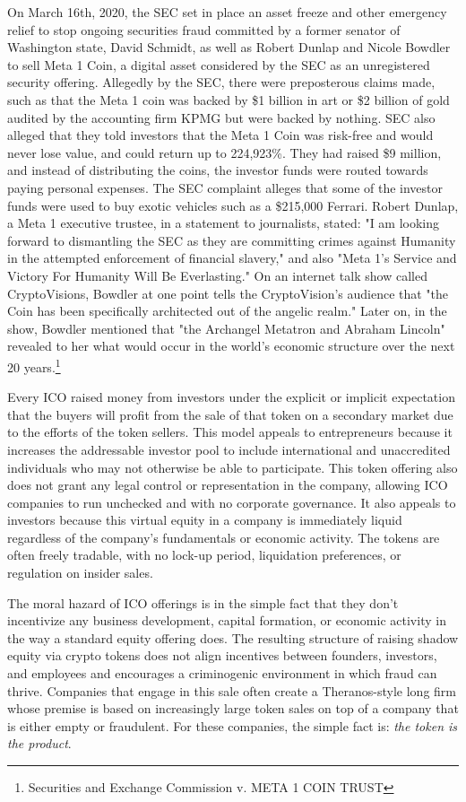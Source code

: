 On March 16th, 2020, the SEC set in place an asset freeze and other emergency
relief to stop ongoing securities fraud committed by a former senator of
Washington state, David Schmidt, as well as Robert Dunlap and Nicole Bowdler to
sell Meta 1 Coin, a digital asset considered by the SEC as an unregistered
security offering. Allegedly by the SEC, there were preposterous claims made,
such as that the Meta 1 coin was backed by \$1 billion in art or \$2 billion of
gold audited by the accounting firm KPMG but were backed by nothing. SEC also
alleged that they told investors that the Meta 1 Coin was risk-free and would
never lose value, and could return up to 224,923\%. They had raised \$9 million,
and instead of distributing the coins, the investor funds were routed towards
paying personal expenses. The SEC complaint alleges that some of the investor
funds were used to buy exotic vehicles such as a \$215,000 Ferrari. Robert
Dunlap, a Meta 1 executive trustee, in a statement to journalists, stated: "I am
looking forward to dismantling the SEC as they are committing crimes against
Humanity in the attempted enforcement of financial slavery," and also "Meta 1's
Service and Victory For Humanity Will Be Everlasting." On an internet talk show
called CryptoVisions, Bowdler at one point tells the CryptoVision's audience
that "the Coin has been specifically architected out of the angelic realm."
Later on, in the show, Bowdler mentioned that "the Archangel Metatron and
Abraham Lincoln" revealed to her what would occur in the world's economic
structure over the next 20 years.\footnote{Securities and
Exchange Commission v. META 1 COIN TRUST} \cite{noauthor_securities_2020-4}

Every ICO raised money from investors under the explicit or implicit expectation
that the buyers will profit from the sale of that token on a secondary market
due to the efforts of the token sellers. This model appeals to entrepreneurs
because it increases the addressable investor pool to include international and
unaccredited individuals who may not otherwise be able to participate. This
token offering also does not grant any legal control or representation in the
company, allowing ICO companies to run unchecked and with no corporate
governance. It also appeals to investors because this virtual equity in a
company is immediately liquid regardless of the company's fundamentals or
economic activity. The tokens are often freely tradable, with no lock-up period,
liquidation preferences, or regulation on insider sales.

The moral hazard of ICO offerings is in the simple fact that they don't
incentivize any business development, capital formation, or economic activity in
the way a standard equity offering does. The resulting structure of raising
shadow equity via crypto tokens does not align incentives between founders,
investors, and employees and encourages a criminogenic environment in which
fraud can thrive. Companies that engage in this sale often create a
Theranos-style long firm whose premise is based on increasingly large token
sales on top of a company that is either empty or fraudulent. For these
companies, the simple fact is: \textit{the token is the product}.
\cite{momtaz_entrepreneurial_2020}

